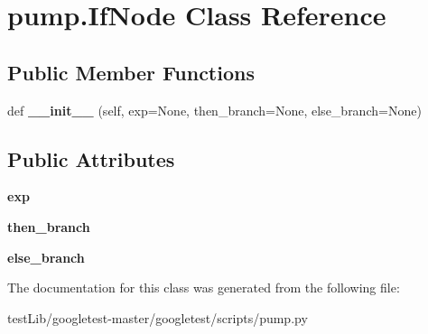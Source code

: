 \hypertarget{classpump_1_1IfNode}{}\section{pump.\+If\+Node Class Reference}
\label{classpump_1_1IfNode}
\subsection*{Public Member Functions}
\begin{DoxyCompactItemize}
\item 
\mbox{\label{classpump_1_1IfNode_ab8bff21c18d60b461f7b6fa9dfa59f7c}} 
def {\bfseries \+\_\+\+\_\+init\+\_\+\+\_\+} (self, exp=None, then\+\_\+branch=None, else\+\_\+branch=None)
\end{DoxyCompactItemize}
\subsection*{Public Attributes}
\begin{DoxyCompactItemize}
\item 
\mbox{\label{classpump_1_1IfNode_a92042e4262196ffd7366350539f512d8}} 
{\bfseries exp}
\item 
\mbox{\label{classpump_1_1IfNode_aa9e2e488564629f8dc0d64d165a19ffa}} 
{\bfseries then\+\_\+branch}
\item 
\mbox{\label{classpump_1_1IfNode_a12e422b16ed4291f15cd95cd6e7f81eb}} 
{\bfseries else\+\_\+branch}
\end{DoxyCompactItemize}


The documentation for this class was generated from the following file\+:\begin{DoxyCompactItemize}
\item 
test\+Lib/googletest-\/master/googletest/scripts/pump.\+py\end{DoxyCompactItemize}
